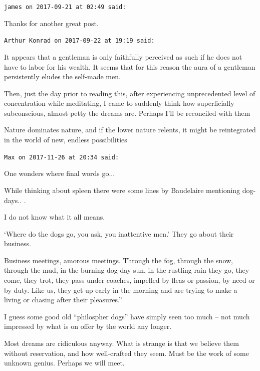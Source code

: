\begin{footnotesize}
\begin{sffamily}
\texttt{james on 2017-09-21 at 02:49 said:}

Thanks for another great post.

\hfill

\texttt{Arthur Konrad on 2017-09-22 at 19:19 said:}

It appears that a gentleman is only faithfully perceived as such if he does not have to labor for his wealth. It seems that for this reason the aura of a gentleman persistently eludes the self-made men.

Then, just the day prior to reading this, after experiencing unprecedented level of concentration while meditating, I came to suddenly think how superficially subconscious, almost petty the dreams are. Perhaps I'll be reconciled with them

Nature dominates nature, and if the lower nature relents, it might be reintegrated in the world of new, endless possibilities

\hfill

\texttt{Max on 2017-11-26 at 20:34 said:}

One wonders where final words go... 

While thinking about spleen there were some lines by Baudelaire mentioning dog-days.. .

I do not know what it all means.

`Where do the dogs go, you ask, you inattentive men.' They go about their business.

Business meetings, amorous meetings. Through the fog, through the snow, through the mud, in the burning dog-day sun, in the rustling rain they go, they come, they trot, they pass under coaches, impelled by fleas or passion, by need or by duty. Like us, they get up early in the morning and are trying to make a living or chasing after their pleasures.''

I guess some good old ``philospher dogs'' have simply seen too much -- not much impressed by what is on offer by the world any longer.

Most dreams are ridiculous anyway. What is strange is that we believe them without reservation, and how well-crafted they seem. Must be the work of some unknown genius. Perhaps we will meet.

\end{sffamily}
\end{footnotesize}


